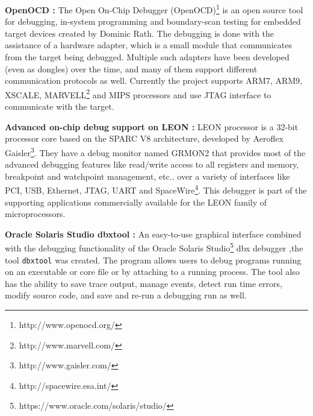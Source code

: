 \begin{description}
	\item \textbf{OpenOCD :} The Open On-Chip Debugger (OpenOCD)\footnote{http://www.openocd.org/} is an open source tool for debugging, in-system programming and boundary-scan testing for embedded target devices created by Dominic Rath\cite{openOCDthesis}. The debugging is done with the assistance of a hardware adapter, which is a small module that communicates from the target being debugged. Multiple such adapters have been developed (even as dongles) over the time, and many of them support different communication protocols as well. Currently the project supports ARM7, ARM9, XSCALE, MARVELL\footnote{http://www.marvell.com/} and MIPS processors and use JTAG interface to communicate with the target.
	
	\item \textbf{Advanced on-chip debug support on LEON :} LEON processor is a 32-bit processor core based on the SPARC V8 architecture, developed by Aeroflex Gaisler\footnote{http://www.gaisler.com/}.
	They have a debug monitor named GRMON2\cite{gaisler} that provides  most of the advanced debugging features like read/write access to all registers and memory, breakpoint and watchpoint management, etc.. over a variety of interfaces like PCI, USB, Ethernet, JTAG, UART and SpaceWire\footnote{http://spacewire.esa.int/}. This debugger is part of the supporting applications commercially available for the LEON family of microprocessors.
	
	\item \textbf{Oracle Solaris Studio dbxtool :} An easy-to-use graphical interface combined with the debugging functionality of the Oracle Solaris Studio\footnote{https://www.oracle.com/solaris/studio/} dbx debugger ,the tool \texttt{dbxtool} was created\cite{oracle}. The program allows users to debug programs running on an executable or core file or by attaching to a running process.  The tool also has the ability to save trace output, manage events, detect run time errors, modify source code, and save and re-run a debugging run as well.
\end{description}

